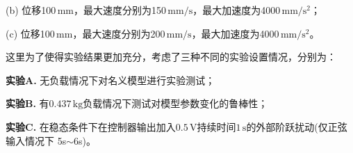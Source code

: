 (b) 位移100$\,\text{mm}$，最大速度分别为150$\,\text{mm$/$s}$，最大加速度为4000$\,\text{mm/s$^2$}$；

(c) 位移100$\,\text{mm}$，最大速度分别为200$\,\text{mm$/$s}$，最大加速度为4000$\,\text{mm/s$^2$}$。

这里为了使得实验结果更加充分，考虑了三种不同的实验设置情况，分别为：

\textbf{实验A.} 无负载情况下对名义模型进行实验测试；

\textbf{实验B.} 有$0.437\,\text{kg}$负载情况下测试对模型参数变化的鲁棒性；

\textbf{实验C.} 在稳态条件下在控制器输出加入$0.5\,\text{V}$持续时间$1\,\text{s}$的外部阶跃扰动(仅正弦输入情况下 5s$\sim$6s)。


\begin{figure}[H]
	\centering
    \\
	\\

\end{figure}
